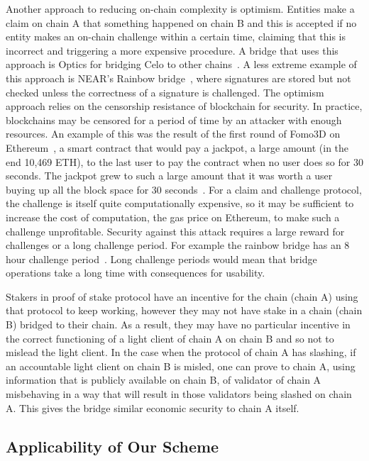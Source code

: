 \noindent Another approach to reducing on-chain complexity is optimism. Entities make a claim on chain A that something happened on chain B and this is accepted if no entity makes an on-chain challenge within a certain time, claiming that this is incorrect and triggering a more expensive procedure. A bridge that uses this approach is Optics for bridging Celo to other chains~\cite{CeloOptics}. A less extreme example of this approach is NEAR's Rainbow bridge~\cite{NEARrainbowB}, where signatures are stored but not checked unless the correctness of a signature is challenged. The optimism approach relies on the censorship resistance of blockchain for security. In practice, blockchains may be censored for a period of time by an attacker with enough resources. An example of this was the result of the first round of Fomo3D on Ethereum~\cite{Fomo3DPM}, a smart contract that would pay a jackpot, a large amount (in the end 10,469 ETH), to the last user to pay the contract when no user does so for 30 seconds. The jackpot grew to such a large amount that it was worth a user buying up all the block space for 30 seconds~\cite{Fomo3DPM}. For a claim and challenge protocol, the challenge is itself quite computationally expensive, so it may be sufficient to increase the cost of computation, the gas price on Ethereum, to make such a challenge unprofitable. Security against this attack requires a large reward for challenges or a long challenge period. For example the rainbow bridge has an 8 hour challenge period~\cite{RainbowBridgeFAQ}. Long challenge periods would mean that bridge operations take a long time with consequences for usability.

\noindent Stakers in proof of stake protocol have an incentive for the chain (chain A) using that protocol to keep working, however they may not have stake in a chain (chain B) bridged to their chain. As a result, they may have no particular incentive in the correct functioning of a light client of chain A on chain B and so not to mislead the light client. In the case when the protocol of chain A has slashing, if an accountable light client on chain B is misled, one can prove to chain A, using information that is publicly available on chain B, of validator of chain A misbehaving in a way that will result in those validators being slashed on chain A. This gives the bridge similar economic security to chain A itself.

\vspace{-0.08in}
\subsection{Applicability of Our Scheme}

